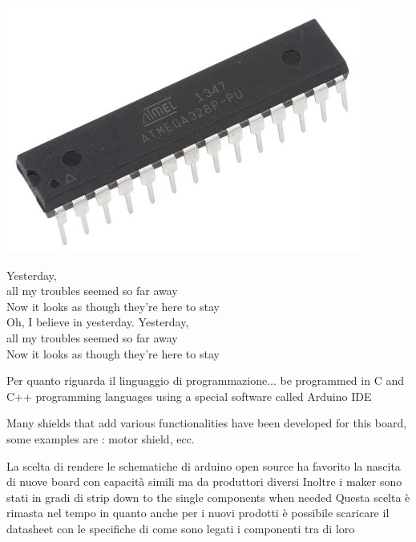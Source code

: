 		\noindent
		\begin{minipage}{0.5\textwidth}%
			\includegraphics[width=\textwidth]{resources/img/chap3/ATMega328}
		\end{minipage}%
		\hfill%
		\begin{minipage}{0.55\textwidth}\raggedright
			Yesterday,\\
			all my troubles seemed so far away\\
			Now it looks as though they're here to stay\\
			Oh, I believe in yesterday.				Yesterday,\\
			all my troubles seemed so far away\\
			Now it looks as though they're here to stay\\
		\end{minipage}	
		
		Per quanto riguarda il linguaggio di programmazione... 
		be programmed in C and C++ programming languages using a special software called Arduino IDE
		
		Many shields that add various functionalities have been developed for this board, some examples are :  motor shield, ecc.
		
		La scelta di rendere le schematiche di arduino open source ha favorito la nascita di nuove board con capacità simili ma da produttori diversi
		Inoltre i maker sono stati in gradi di strip down to the single components when needed 
		Questa scelta è rimasta nel tempo in quanto anche per i nuovi prodotti è possibile scaricare il datasheet con le specifiche di come sono legati i componenti tra di loro
		
